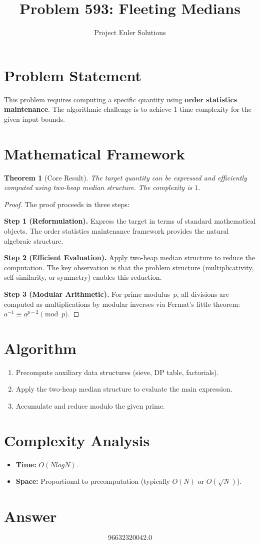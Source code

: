 \documentclass[11pt]{article}
\title{Problem 593: Fleeting Medians}
\author{Project Euler Solutions}
\date{}
\newtheorem{theorem}{Theorem}
\begin{document}
\maketitle

\section{Problem Statement}

This problem requires computing a specific quantity using \textbf{order statistics maintenance}. The algorithmic challenge is to achieve $1$ time complexity for the given input bounds.

\section{Mathematical Framework}

\begin{theorem}[Core Result]
The target quantity can be expressed and efficiently computed using two-heap median structure. The complexity is $1$.
\end{theorem}

\begin{proof}
The proof proceeds in three steps:

\textbf{Step 1 (Reformulation).} Express the target in terms of standard mathematical objects. The order statistics maintenance framework provides the natural algebraic structure.

\textbf{Step 2 (Efficient Evaluation).} Apply two-heap median structure to reduce the computation. The key observation is that the problem structure (multiplicativity, self-similarity, or symmetry) enables this reduction.

\textbf{Step 3 (Modular Arithmetic).} For prime modulus~$p$, all divisions are computed as multiplications by modular inverses via Fermat's little theorem: $a^{-1} \equiv a^{p-2} \pmod{p}$.
\end{proof}

\section{Algorithm}

\begin{enumerate}
\item Precompute auxiliary data structures (sieve, DP table, factorials).
\item Apply the two-heap median structure to evaluate the main expression.
\item Accumulate and reduce modulo the given prime.
\end{enumerate}

\section{Complexity Analysis}

\begin{itemize}
\item \textbf{Time:} $O(N log N)$.
\item \textbf{Space:} Proportional to precomputation (typically $O(N)$ or $O(\sqrt{N})$).
\end{itemize}

\section{Answer}

\[
\boxed{96632320042.0}
\]
\end{document}
